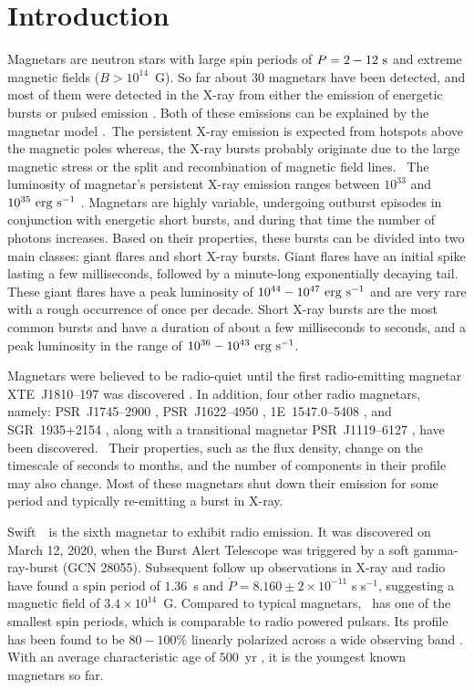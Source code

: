\documentclass[twocolumn]{emulateapj}
\begin{document}
\section{Introduction}
\label{sec:intro}
Magnetars are neutron stars with large spin periods of $P=2-12~{\rm s}$ and extreme magnetic 
fields ($B > 10^{14}$~G). So far about 30 magnetars have been detected, and most of them 
were detected in the X-ray from either the emission of energetic bursts or pulsed emission 
\citep{kaspi2017}. Both of these emissions can be explained by the magnetar model 
\citep{duncan1992,paczynski92}. The persistent X-ray emission is expected from hotspots 
above the magnetic poles whereas, the X-ray bursts probably originate due to the large magnetic 
stress or the split and recombination of magnetic field lines. 
The luminosity of magnetar's persistent X-ray emission ranges between $10^{33}$ and 
$10^{35}~{\rm erg~s}^{-1}$ \citep{thompson2002,lyutikob2003}. Magnetars are highly variable, 
undergoing outburst episodes in conjunction with energetic short bursts, and during that time 
the number of photons increases. Based on their properties, these bursts can be divided into 
two main classes: giant flares \citep{palmer2005} and short X-ray bursts. Giant flares have an 
initial spike lasting a few milliseconds, followed by a minute-long exponentially decaying tail. 
These giant flares have a peak luminosity of $10^{44} - 10^{47}~{\rm erg~s}^{-1}$ and are very 
rare with a rough occurrence of once per decade. Short X-ray bursts are the most common bursts 
and have a duration of about a few milliseconds to seconds, and a peak luminosity in the range 
of $10^{36} - 10^{43}~{\rm erg~s}^{-1}$.%
 
 
Magnetars were believed to be radio-quiet until the first radio-emitting magnetar 
XTE~J1810--197 was discovered \citep{camilo2006}. In addition, four other radio 
magnetars, namely: PSR~J1745--2900 \citep{eatough2013}, PSR~J1622--4950 \citep{levin2010},
1E~1547.0--5408 \citep{camilo20071e}, and SGR~1935+2154 \citep{zhu2020}, along with a 
transitional magnetar PSR~J1119--6127 \citep{Majid+2017, pearlman2019b}, have been discovered. 
Their properties, such as the flux density, change on the timescale of seconds to months, 
and the number of components in their profile may also change. Most of these magnetars 
shut down their emission for some period and typically re-emitting a burst in X-ray. 

Swift~\jmag\ is the sixth magnetar to exhibit radio emission. 
It was discovered on March 12, 2020, when the Burst Alert Telescope was triggered by a 
soft gamma-ray-burst (GCN 28055). Subsequent follow up observations in X-ray \citep{esposito20} 
and radio \citep{champion2020} have found a spin period of $1.36$~s and 
$\dot{P} = 8.160 \pm 2 \times 10^{-11}$ s s$^{-1}$, suggesting a magnetic field of 
$3.4 \times 10^{14}$~G. Compared to typical magnetars, \jmag\ has one of the smallest 
spin periods, which is comparable to radio powered pulsars. Its profile has been found 
to be $80-100 \%$ linearly polarized across a wide observing band \citep{lower2020}. 
With an average characteristic age of $500$~yr \citep{champion2020}, it is the youngest 
known magnetars so far. 
\end{document}
